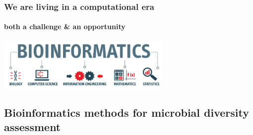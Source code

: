 \documentclass{beamer}
\begin{document}
   \begin{frame}

      \frametitle{We are living in a computational era}
      \framesubtitle{both a challenge \& an opportunity}

      \includegraphics[width=85mm]{resources/bioinfo_transparent.png}

   \end{frame}




   \begin{darkframes}
      \section{
         Bioinformatics methods for microbial diversity assessment
      }
   
   \end{darkframes}
\end{document}
